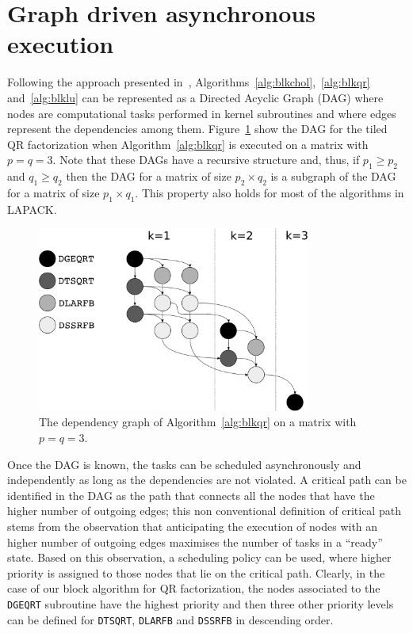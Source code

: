 \documentclass{article}
\begin{document}
\section{Graph driven asynchronous execution}
\label{sec:async}
Following the approach presented
in~\cite{Kurzak:2006:ILA,para06,tiledqr},
Algorithms~\ref{alg:blkchol},~\ref{alg:blkqr} and~\ref{alg:blklu} can
be represented as a Directed Acyclic Graph (DAG) where nodes are
computational tasks performed in kernel subroutines and where edges
represent the dependencies among them.  Figure~\ref{fig:qr_dag} show
the DAG for the tiled QR factorization when Algorithm~\ref{alg:blkqr}
is executed on a matrix with $p=q=3$.  Note that these DAGs have a
recursive structure and, thus, if $p_1 \ge p_2$ and $q_1 \ge q_2$ then
the DAG for a matrix of size $p_2 \times q_2$ is a subgraph of the DAG
for a matrix of size $p_1 \times q_1$. This property also holds for
most of the algorithms in LAPACK.

\begin{figure}[!h]
  \begin{center}
    \includegraphics[width=0.8\textwidth]{images/qr_dag_3x3_bw}
  \caption{\label{fig:qr_dag}The dependency graph of
    Algorithm~\ref{alg:blkqr} on a matrix with $p=q=3$.}
  \end{center}
\end{figure}

Once the DAG is known, the tasks can be scheduled asynchronously and
independently as long as the dependencies are not violated.  A
critical path can be identified in the DAG as the path that connects
all the nodes that have the higher number of outgoing edges; this non
conventional definition of critical path stems from the observation
that anticipating the execution of nodes with an higher number of
outgoing edges maximises the number of tasks in a ``ready''
state.
Based on this observation, a scheduling policy can be used, where
higher priority is assigned to those nodes that lie on the critical
path.  Clearly, in the case of our block algorithm for QR
factorization, the nodes associated to the \texttt{DGEQRT} subroutine
have the highest priority and then three other priority levels can be
defined for \texttt{DTSQRT}, \texttt{DLARFB} and \texttt{DSSRFB} in
descending order.
\end{document}
